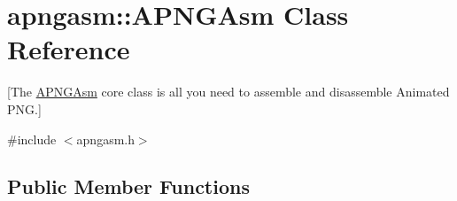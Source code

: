 \hypertarget{classapngasm_1_1APNGAsm}{\section{apngasm\-:\-:A\-P\-N\-G\-Asm Class Reference}
\label{classapngasm_1_1APNGAsm}
}


\mbox{[}The \hyperlink{classapngasm_1_1APNGAsm}{A\-P\-N\-G\-Asm} core class is all you need to assemble and disassemble Animated P\-N\-G.\mbox{]}  




{\ttfamily \#include $<$apngasm.\-h$>$}

\subsection*{Public Member Functions}
